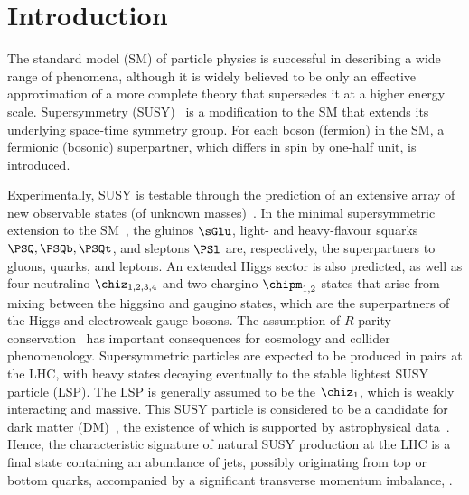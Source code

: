 \section{Introduction}
\label{sec:introduction}

The standard model (SM) of particle physics is successful in
describing a wide range of phenomena, although it is widely believed
to be only an effective approximation of a more complete theory that
supersedes it at a higher energy scale. Supersymmetry
(SUSY)~\cite{ref:SUSY-1, ref:SUSY0, ref:SUSY3, ref:SUSY1} is a
modification to the SM that extends its underlying space-time symmetry
group. For each boson (fermion) in the SM, a fermionic (bosonic)
superpartner, which differs in spin by one-half unit, is introduced.

Experimentally, SUSY is testable through the prediction of an
extensive array of new observable states (of unknown
masses)~\cite{ref:SUSY4, ref:SUSY2}. In the minimal supersymmetric
extension to the SM~\cite{ref:SUSY2}, the gluinos $\sGlu$, light- and
heavy-flavour squarks $\PSQ, \PSQb, \PSQt$, and sleptons $\PSl$ are,
respectively, the superpartners to gluons, quarks, and leptons. An
extended Higgs sector is also predicted, as well as four neutralino
$\chiz_{1,2,3,4}$ and two chargino $\chipm_{1,2}$ states that arise
from mixing between the higgsino and gaugino states, which are the
superpartners of the Higgs and electroweak gauge bosons.  The
assumption of $R$-parity conservation~\cite{Farrar:1978xj} has
important consequences for cosmology and collider
phenomenology. Supersymmetric particles are expected to be produced in
pairs at the LHC, with heavy states decaying eventually to the stable
lightest SUSY particle (LSP). The LSP is generally assumed to be the
$\chiz_1$, which is weakly interacting and massive. This SUSY particle
is considered to be a candidate for dark matter
(DM)~\cite{Jungman:1995df}, the existence of which is supported by
astrophysical data~\cite{1674-1137-38-9-090001}.  Hence, the
characteristic signature of natural SUSY production at the LHC is a
final state containing an abundance of jets, possibly originating from
top or bottom quarks, accompanied by a significant transverse momentum
imbalance, \ptvecmiss.

